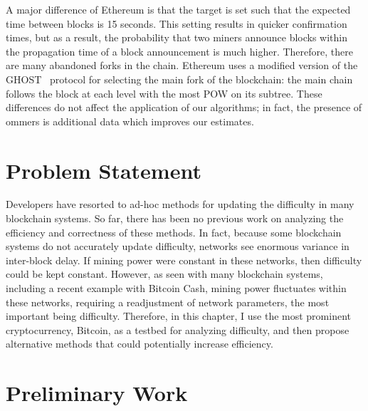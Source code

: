 A major difference of Ethereum is that the target is set such that the
expected time between blocks is 15 seconds. This setting results
in quicker confirmation times, but as a result, the probability that two
miners announce blocks within the propagation time of a block
announcement is much higher. Therefore, there are many abandoned
forks in the chain. Ethereum uses a modified version of the GHOST~\cite{Sompolinsky:2015}
protocol for selecting the main fork of the blockchain: the main chain
follows the block at each level with the most POW on its subtree.
These differences do not affect the application of our algorithms; in
fact, the presence of ommers is additional data which improves our
estimates.

\section{Problem Statement}
Developers have resorted to ad-hoc methods for updating the difficulty in many blockchain systems. So far, there has been no previous work on analyzing the efficiency and correctness of these methods. In fact, because some blockchain systems do not accurately update difficulty, networks see enormous variance in inter-block delay. If mining power were constant in these networks, then difficulty could be kept constant. However, as seen with many blockchain systems, including a recent example with Bitcoin Cash, mining power fluctuates within these networks, requiring a readjustment of network parameters, the most important being difficulty. Therefore, in this chapter, I use the most prominent cryptocurrency, Bitcoin, as a testbed for analyzing difficulty, and then propose alternative methods that could potentially increase efficiency. 

\section{Preliminary Work}
